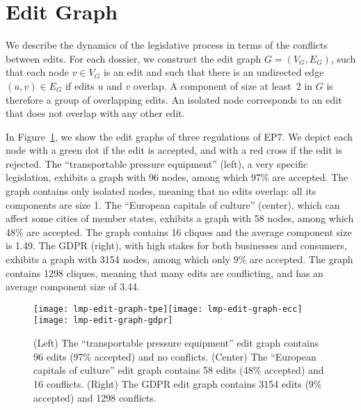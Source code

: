 \section{Edit Graph}
\label{sec:collconf}

We describe the dynamics of the legislative process in terms of the conflicts between edits.
For each dossier, we construct the edit graph $ G = (V_G, E_G) $, such that each node $ v \in V_G $ is an edit and such that there is an undirected edge $ (u, v) \in E_G $ if edits $u$ and $v$ overlap.
A component of size at least~2 in $G$ is therefore a group of overlapping edits. %
An isolated node corresponds to an edit that does not overlap with any other edit.

In Figure~\ref{fig:edit_graph}, we show the edit graphs of three regulations of EP7.
We depict each node with a green dot if the edit is accepted, and with a red cross if the edit is rejected.
The ``transportable pressure equipment'' (left), a very specific legislation, exhibits a graph with 96 nodes, among which 97\% are accepted.
The graph contains only isolated nodes, meaning that no edits overlap: all its components are size 1.
The ``European capitals of culture'' (center), which can affect some cities of member states, exhibits a graph with 58 nodes, among which 48\% are accepted.
The graph contains 16 cliques and the average component size is 1.49.
The GDPR (right), with high stakes for both businesses and consumers, exhibits a graph with 3154 nodes, among which only 9\% are accepted.
The graph contains 1298 cliques, meaning that many edits are conflicting, and has an average component size of 3.44.

\begin{figure}
  \centering
	\newcommand{\imgscale}{0.88}
	\texttt{[image: lmp-edit-graph-tpe]}\hfill\texttt{[image: lmp-edit-graph-ecc]}\hfill\texttt{[image: lmp-edit-graph-gdpr]}
	\caption{
		(Left) The ``transportable pressure equipment'' edit graph contains 96 edits (97\% accepted) and no conflicts.
		(Center) The ``European capitals of culture'' edit graph contains 58 edits (48\% accepted) and 16 conflicts.
		(Right) The GDPR edit graph contains 3154 edits (9\% accepted) and 1298 conflicts.
	}
	\label{fig:edit_graph}
\end{figure}

